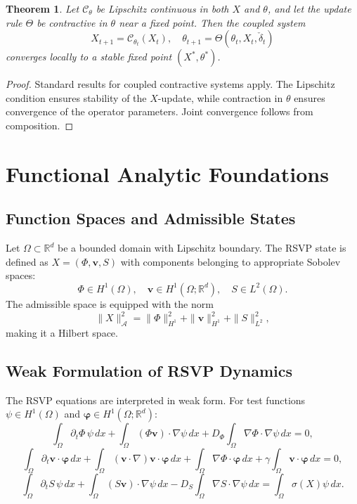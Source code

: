 \documentclass[12pt, oneside]{article}
\newtheorem{theorem}{Theorem}
\begin{document}
\begin{theorem}
Let $\mathcal{C}_\theta$ be Lipschitz continuous in both $X$ and $\theta$, and let the update rule $\Theta$ be contractive in $\theta$ near a fixed point. Then the coupled system
\[
X_{t+1} = \mathcal{C}_{\theta_t}(X_t), \quad \theta_{t+1} = \Theta(\theta_t, X_t, \check{\delta}_t)
\]
converges locally to a stable fixed point $(X^\ast, \theta^\ast)$.
\end{theorem}

\begin{proof}
Standard results for coupled contractive systems apply. The Lipschitz condition ensures stability of the $X$-update, while contraction in $\theta$ ensures convergence of the operator parameters. Joint convergence follows from composition.
\end{proof}

\section{Functional Analytic Foundations}

\subsection{Function Spaces and Admissible States}

Let $\Omega \subset \mathbb{R}^d$ be a bounded domain with Lipschitz boundary. The RSVP state is defined as $X = (\Phi, \mathbf{v}, S)$ with components belonging to appropriate Sobolev spaces:
\[
\Phi \in H^1(\Omega), \quad \mathbf{v} \in H^1(\Omega; \mathbb{R}^d), \quad S \in L^2(\Omega).
\]
The admissible space is equipped with the norm
\[
\|X\|_{\mathcal{A}}^2 = \|\Phi\|_{H^1}^2 + \|\mathbf{v}\|_{H^1}^2 + \|S\|_{L^2}^2,
\]
making it a Hilbert space.

\subsection{Weak Formulation of RSVP Dynamics}

The RSVP equations are interpreted in weak form. For test functions $\psi \in H^1(\Omega)$ and $\boldsymbol{\varphi} \in H^1(\Omega; \mathbb{R}^d)$:
\[
\int_\Omega \partial_t \Phi \, \psi \, dx + \int_\Omega (\Phi \mathbf{v}) \cdot \nabla \psi \, dx + D_\Phi \int_\Omega \nabla \Phi \cdot \nabla \psi \, dx = 0,
\]
\[
\int_\Omega \partial_t \mathbf{v} \cdot \boldsymbol{\varphi} \, dx + \int_\Omega (\mathbf{v} \cdot \nabla)\mathbf{v} \cdot \boldsymbol{\varphi} \, dx + \int_\Omega \nabla \Phi \cdot \boldsymbol{\varphi} \, dx + \gamma \int_\Omega \mathbf{v} \cdot \boldsymbol{\varphi} \, dx = 0,
\]
\[
\int_\Omega \partial_t S \, \psi \, dx + \int_\Omega (S \mathbf{v}) \cdot \nabla \psi \, dx - D_S \int_\Omega \nabla S \cdot \nabla \psi \, dx = \int_\Omega \sigma(X) \psi \, dx.
\]
\end{document}
